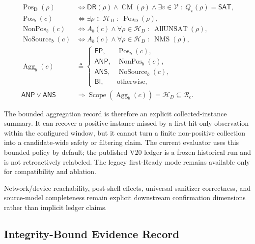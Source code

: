 {\small
\setlength{\jot}{0pt}
\setlength{\abovedisplayskip}{2pt}
\setlength{\belowdisplayskip}{2pt}
\begin{equation}
\begin{aligned}
\operatorname{Pos}_{\mathrm D}(\rho)&\iff
  \mathsf{DR}(\rho)\land\operatorname{CM}(\rho)\land
  \exists v\in\mathcal V\;:\;Q_v(\rho)=\mathsf{SAT},\\[-1mm]
\operatorname{Pos}_b(c)&\iff
  \exists\rho\in\mathcal H_D\;:\;
  \operatorname{Pos}_{\mathrm D}(\rho),\\[-1mm]
\operatorname{NonPos}_b(c)&\iff
  A_b(c)\land\forall\rho\in\mathcal H_D\;:\;
  \operatorname{AllUNSAT}(\rho),\\[-1mm]
\operatorname{NoSource}_b(c)&\iff
  A_b(c)\land\forall\rho\in\mathcal H_D\;:\;
  \operatorname{NMS}(\rho),\\[-1mm]
\operatorname{Agg}_b(c)&\triangleq
  \begin{cases}
    \mathsf{EP},  & \operatorname{Pos}_b(c),\\[-1mm]
    \mathsf{ANP}, & \operatorname{NonPos}_b(c),\\[-1mm]
    \mathsf{ANS}, & \operatorname{NoSource}_b(c),\\[-1mm]
    \mathsf{BI},  & \text{otherwise},
  \end{cases}\\[-1mm]
\mathsf{ANP}\lor\mathsf{ANS}&\Rightarrow
  \operatorname{Scope}\!\left(\operatorname{Agg}_b(c)\right)
  =\mathcal H_D\subseteq\mathcal R_c.
\end{aligned}
\label{eq:bounded-aggregation}
\end{equation}
}

The bounded aggregation record is therefore an explicit collected-instance
summary. It can recover a positive instance missed by a first-hit-only
observation within the configured window, but it cannot turn a finite
non-positive collection into a candidate-wide safety or filtering claim. The
current evaluator uses this bounded policy by default; the published V20 ledger
is a frozen historical run and is not retroactively relabeled. The legacy
first-Ready mode remains available only for compatibility and ablation.

Network/device reachability, post-shell effects, universal sanitizer
correctness, and source-model completeness remain explicit downstream
confirmation dimensions rather than implicit ledger claims.

\subsection{Integrity-Bound Evidence Record}

